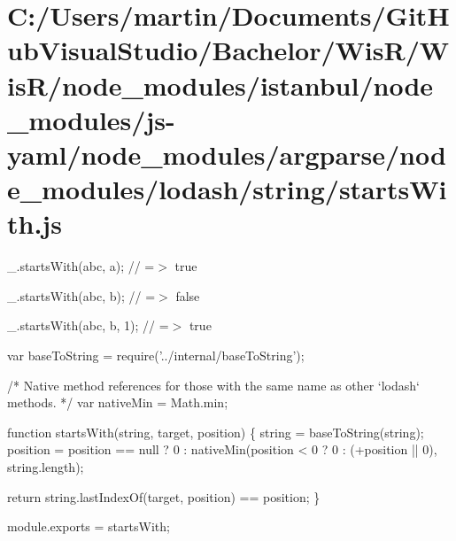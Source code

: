\hypertarget{_c_1_2_users_2martin_2_documents_2_git_hub_visual_studio_2_bachelor_2_wis_r_2_wis_r_2node_module4abf9e0f369dcd241493ffbcfee8830f}{}\section{C\+:/\+Users/martin/\+Documents/\+Git\+Hub\+Visual\+Studio/\+Bachelor/\+Wis\+R/\+Wis\+R/node\+\_\+modules/istanbul/node\+\_\+modules/js-\/yaml/node\+\_\+modules/argparse/node\+\_\+modules/lodash/string/starts\+With.\+js}
\+\_\+.\+starts\+With(\textquotesingle{}abc\textquotesingle{}, \textquotesingle{}a\textquotesingle{}); // =$>$ true

\+\_\+.\+starts\+With(\textquotesingle{}abc\textquotesingle{}, \textquotesingle{}b\textquotesingle{}); // =$>$ false

\+\_\+.\+starts\+With(\textquotesingle{}abc\textquotesingle{}, \textquotesingle{}b\textquotesingle{}, 1); // =$>$ true


\begin{DoxyCodeInclude}
var baseToString = require(\textcolor{stringliteral}{'../internal/baseToString'});

\textcolor{comment}{/* Native method references for those with the same name as other `lodash` methods. */}
var nativeMin = Math.min;

\textcolor{keyword}{function} startsWith(\textcolor{keywordtype}{string}, target, position) \{
  \textcolor{keywordtype}{string} = baseToString(\textcolor{keywordtype}{string});
  position = position == null
    ? 0
    : nativeMin(position < 0 ? 0 : (+position || 0), \textcolor{keywordtype}{string}.length);

  \textcolor{keywordflow}{return} \textcolor{keywordtype}{string}.lastIndexOf(target, position) == position;
\}

module.exports = startsWith;
\end{DoxyCodeInclude}
 